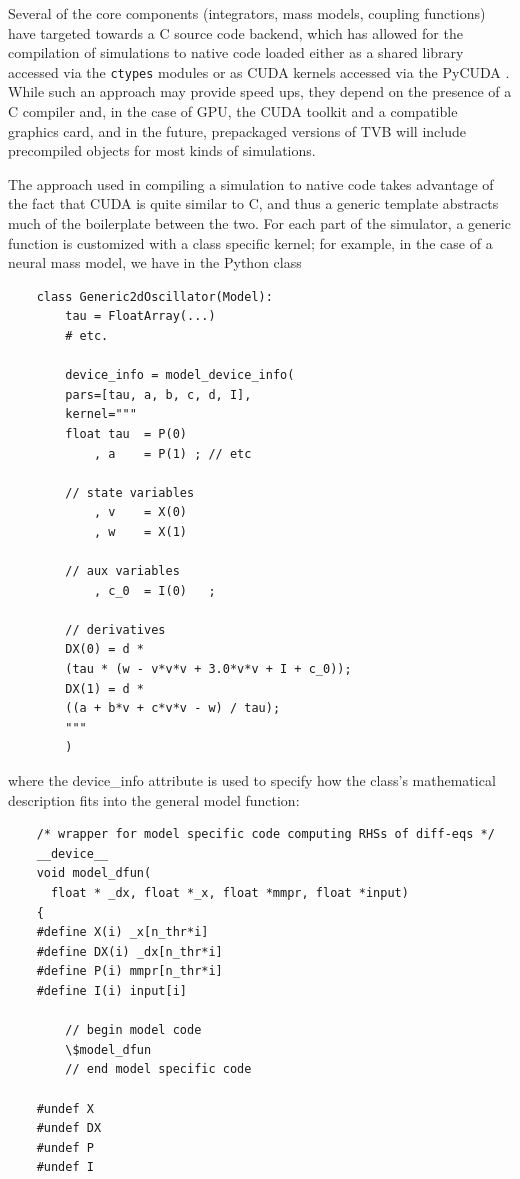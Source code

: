     Several of the core components (integrators, mass models, coupling
    functions) have targeted towards a C source code backend, which has
    allowed for the compilation of simulations to native code loaded 
    either as a shared library accessed via the \texttt{ctypes} modules
    or as CUDA kernels accessed via the PyCUDA \cite{PyCUDA}.
    While such an approach may provide speed ups, they depend on the
    presence of a C compiler and, in the case of GPU, the CUDA toolkit and
    a compatible graphics card, and in the future, prepackaged versions of TVB
    will include precompiled objects for most kinds of simulations. 

    The approach used in compiling a simulation to native code takes advantage
    of the fact that CUDA is quite similar to C, and thus a generic template
    abstracts much of the boilerplate between the two. For each part of the 
    simulator, a generic function is customized with a class specific kernel;
    for example, in the case of a neural mass model, we have in the Python class

    \begin{lstlisting}
    class Generic2dOscillator(Model):
        tau = FloatArray(...)
        # etc.

        device_info = model_device_info(
        pars=[tau, a, b, c, d, I],
        kernel="""
        float tau  = P(0)
            , a    = P(1) ; // etc

        // state variables
            , v    = X(0)
            , w    = X(1)

        // aux variables
            , c_0  = I(0)   ;

        // derivatives
        DX(0) = d * 
        (tau * (w - v*v*v + 3.0*v*v + I + c_0));
        DX(1) = d * 
        ((a + b*v + c*v*v - w) / tau);
        """
        )
    \end{lstlisting}

    \noindent where the device\_info attribute is used to specify how the
    class's mathematical description fits into the general model function:

    \begin{lstlisting}
    /* wrapper for model specific code computing RHSs of diff-eqs */
    __device__
    void model_dfun(
      float * _dx, float *_x, float *mmpr, float *input)
    {
    #define X(i) _x[n_thr*i]
    #define DX(i) _dx[n_thr*i]
    #define P(i) mmpr[n_thr*i]
    #define I(i) input[i]

        // begin model code
        \$model_dfun
        // end model specific code

    #undef X
    #undef DX
    #undef P
    #undef I
    \end{lstlisting}

